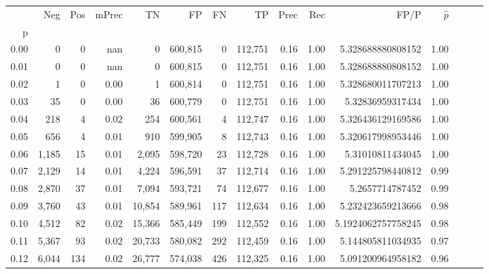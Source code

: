 \begin{tabular}{rrrrrrrrrrrrrrr}
\toprule
{} &     Neg &    Pos & mPrec &       TN &       FP &       FN &       TP &  Prec &   Rec &                   FP/P & $\hat{p}$ \\
p    &         &        &       &          &          &          &          &       &       &                        &           \\
\midrule
0.00 &       0 &      0 &   nan &        0 &  600,815 &        0 &  112,751 &  0.16 &  1.00 &      5.328688880808152 &      1.00 \\
0.01 &       0 &      0 &   nan &        0 &  600,815 &        0 &  112,751 &  0.16 &  1.00 &      5.328688880808152 &      1.00 \\
0.02 &       1 &      0 &  0.00 &        1 &  600,814 &        0 &  112,751 &  0.16 &  1.00 &      5.328680011707213 &      1.00 \\
0.03 &      35 &      0 &  0.00 &       36 &  600,779 &        0 &  112,751 &  0.16 &  1.00 &       5.32836959317434 &      1.00 \\
0.04 &     218 &      4 &  0.02 &      254 &  600,561 &        4 &  112,747 &  0.16 &  1.00 &      5.326436129169586 &      1.00 \\
0.05 &     656 &      4 &  0.01 &      910 &  599,905 &        8 &  112,743 &  0.16 &  1.00 &      5.320617998953446 &      1.00 \\
0.06 &   1,185 &     15 &  0.01 &    2,095 &  598,720 &       23 &  112,728 &  0.16 &  1.00 &       5.31010811434045 &      1.00 \\
0.07 &   2,129 &     14 &  0.01 &    4,224 &  596,591 &       37 &  112,714 &  0.16 &  1.00 &      5.291225798440812 &      0.99 \\
0.08 &   2,870 &     37 &  0.01 &    7,094 &  593,721 &       74 &  112,677 &  0.16 &  1.00 &        5.2657714787452 &      0.99 \\
0.09 &   3,760 &     43 &  0.01 &   10,854 &  589,961 &      117 &  112,634 &  0.16 &  1.00 &      5.232423659213666 &      0.98 \\
0.10 &   4,512 &     82 &  0.02 &   15,366 &  585,449 &      199 &  112,552 &  0.16 &  1.00 &     5.1924062757758245 &      0.98 \\
0.11 &   5,367 &     93 &  0.02 &   20,733 &  580,082 &      292 &  112,459 &  0.16 &  1.00 &      5.144805811034935 &      0.97 \\
0.12 &   6,044 &    134 &  0.02 &   26,777 &  574,038 &      426 &  112,325 &  0.16 &  1.00 &      5.091200964958182 &      0.96 \\

\end{tabular}
